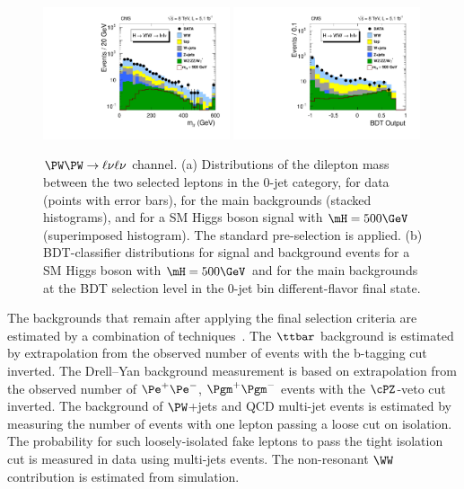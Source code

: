 \begin{figure}[htbp]
\centering
   \includegraphics[width=0.49\textwidth]{figures/WW2l2nuMass.pdf}
   \includegraphics[width=0.49\textwidth]{figures/WW2l2nuBDT.pdf}
   \caption{ $\PW\PW \to \ell\nu\ell\nu$ channel. (a) Distributions of the dilepton mass between the
   two selected leptons in the 0-jet category, for data (points with
   error bars), for the main backgrounds (stacked histograms), and for
   a SM Higgs boson signal with $\mH= 500\GeV$ (superimposed
   histogram). The standard pre-selection is applied.  (b) BDT-classifier
   distributions for signal and background events for a SM
   Higgs boson with $\mH=500\GeV$ and for the main backgrounds at the
   BDT selection level in the 0-jet bin different-flavor final state.}
\label{fig:hww2l2n_bdt_500}
\end{figure}

The backgrounds that remain after applying the final selection criteria are estimated by a combination of techniques~\cite{CMSobservation125}. The $\ttbar$ background is estimated by extrapolation from the observed 
number of events with the b-tagging cut inverted. The Drell--Yan background measurement is based on extrapolation
from the observed number of $\Pe^+\Pe^-$, $\Pgm^+ \Pgm^-$ events with the $\cPZ$-veto cut inverted. The background 
of $\PW$+jets and QCD multi-jet events is estimated by measuring the number of events with one lepton passing a loose
cut on isolation. The probability for such loosely-isolated fake leptons to pass the tight isolation cut is measured in
data using multi-jets events. The non-resonant $\WW$ contribution is estimated from simulation.

